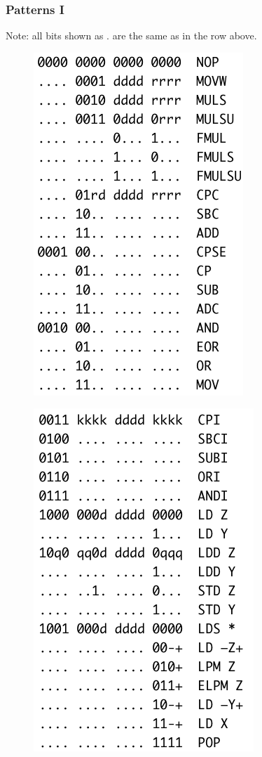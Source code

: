 \documentclass{beamer}
\begin{document}
\begin{frame}
\frametitle{Patterns I}
Note: all bits shown as . are the same as in the row above.
\begin{multicols}{2}
\begin{figure}
	\includegraphics[scale=0.36]{screen1.png}
\end{figure}
\begin{figure}
	\includegraphics[scale=0.36]{screen2.png}
\end{figure}
\end{multicols}
\end{frame}
\end{document}
